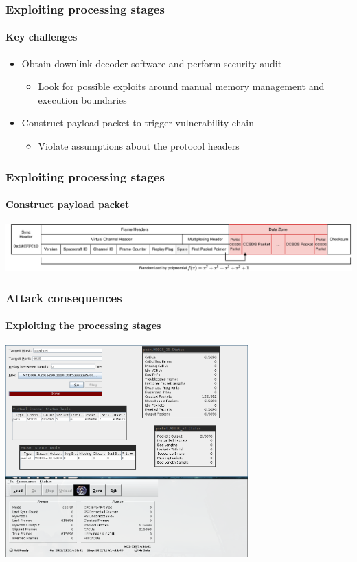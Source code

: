\documentclass{beamer}
\begin{document}
\begin{frame}
  \frametitle{Exploiting processing stages}
  \framesubtitle{Key challenges}
  \begin{itemize}
   \item Obtain downlink decoder software and perform security audit
   \begin{itemize}
     \item Look for possible exploits around manual memory management and execution boundaries
   \end{itemize}
    \item Construct payload packet to trigger vulnerability chain
    \begin{itemize}
      \item Violate assumptions about the protocol headers
    \end{itemize}
  \end{itemize}
\end{frame}


\begin{frame}
  \frametitle{Exploiting processing stages}
  \framesubtitle{Construct payload packet}
  \centering
  \includegraphics[width=\textwidth]{images/cadu_diagram.pdf}
\end{frame}


\begin{frame}
  \frametitle{Attack consequences}
  \framesubtitle{Exploiting the processing stages}
  \centering
  \includegraphics[width=0.7\textwidth]{images/rtstps_correct.png}
\end{frame}
\end{document}
